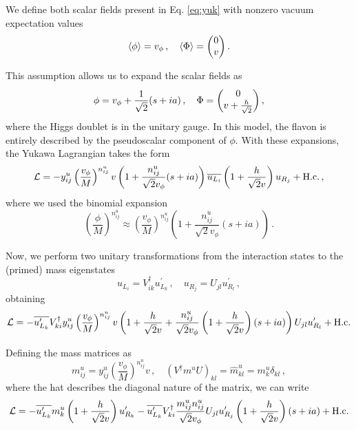 \documentclass[prd,amsfonts,onecolumn,superscriptaddress,aps,nofootinbib,11pt]{revtex4-1}
\begin{document}
We define both scalar fields present in Eq. \ref{eq:yuk} with nonzero vacuum expectation values
\begin{equation}
	\expval{\phi} = v_\phi \,, \quad \expval{\Phi} = \mqty(0 \\ v) \,.
\end{equation}

This assumption allows us to expand the scalar fields as
\begin{equation}
	\phi = v_\phi + \frac{1}{\sqrt{2}}(s + ia) \,, \quad \Phi = \mqty(0 \\ v + \frac{h}{\sqrt{2}}) \,,
\end{equation}
where the Higgs doublet is in the unitary gauge. In this model, the flavon is entirely described by the pseudoscalar component of $\phi$. With these expansions, the Yukawa Lagrangian takes the form
\begin{equation}
	\mathcal{L} = -y_{ij}^u \left( \frac{v_\phi}{M} \right)^{n_{ij}^u}  v \left( 1 + \frac{n_{ij}^u}{\sqrt{2} v_\phi} (s + ia) \right) \overline{u_{L_i}} \left( 1 + \frac{h}{\sqrt{2}v} \right) u_{R_j} + \rm{H.c.} \,,
\end{equation}
where we used the binomial expansion
\begin{equation}
    \left( \frac{\phi}{M} \right)^{n_{ij}^u} \approx \left( \frac{v_{\phi}}{M} \right)^{n_{ij}^u} \left( 1 + \frac{n_{ij}^u}{\sqrt{2} v_{\phi}} (s + ia) \right) \,.
\end{equation}

Now, we perform two unitary transformations from the interaction states to the (primed) mass eigenstates
\begin{equation}
    u_{L_i} =  V^\dagger_{ik} u^{\prime}_{L_k} \,, \quad u_{R_j} = U_{jl} u_{R_l}^{\prime} \,,
\end{equation}
obtaining
\begin{equation}
    \mathcal{L} = - \overline{u_{L_k}^{\prime}} V^\dagger_{ki} y_{ij}^u \left( \frac{v_\phi}{M} \right)^{n_{ij}^u} v \left( 1 + \frac{h}{\sqrt{2}v} + \frac{n_{ij}^u}{\sqrt{2} v_\phi} \left( 1 + \frac{h}{\sqrt{2}v} \right)  (s + ia) \right) U_{jl} u^{\prime}_{R_l} + \rm{H.c.}
\end{equation}

Defining the mass matrices as
\begin{equation}
    m_{ij}^u = y_{ij}^u \left( \frac{v_\phi}{M} \right)^{n_{ij}^u} v \,, \quad \left( V^\dagger m^u U \right)_{kl} = \hat{m}_{kl}^u = m_k^u \delta_{kl} \,,
\end{equation}
where the hat describes the diagonal nature of the matrix, we can write
\begin{equation}
    \mathcal{L} = -\overline{u_{L_k}^\prime} m_k^u \left( 1 + \frac{h}{\sqrt{2}v} \right) u_{R_k}^{\prime} - \overline{u_{L_k}^\prime} V^\dagger_{ki} \frac{m_{ij}^u n_{ij}^u }{\sqrt{2} v_\phi} U_{jl} u_{R_j}^{\prime} \left(1 + \frac{h}{\sqrt{2}v} \right)(s+ia) + \rm{H.c.}
\end{equation}
\end{document}
